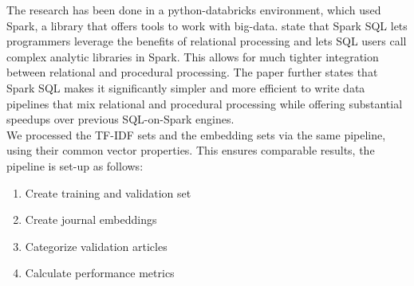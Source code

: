 \documentclass[../../Thesis.tex]{subfiles}
\begin{document}
The research has been done in a python-databricks environment, which used Spark, a library that offers tools to work with big-data. \citet{armbrust2015spark} state that Spark SQL lets programmers leverage the benefits of relational processing and lets SQL users call complex analytic libraries in Spark. This allows for much tighter integration between relational and procedural processing. The paper further states that Spark SQL makes it significantly simpler and more efficient to write data pipelines that mix relational and procedural processing while offering substantial speedups over previous SQL-on-Spark engines.\\
We processed the TF-IDF sets and the embedding sets via the same pipeline, using their common vector properties. This ensures comparable results, the pipeline is set-up as follows:
\begin{enumerate}
\item{Create training and validation set}
\item{Create journal embeddings}
\item{Categorize validation articles}
\item{Calculate performance metrics}
\end{enumerate}
  
\end{document}
